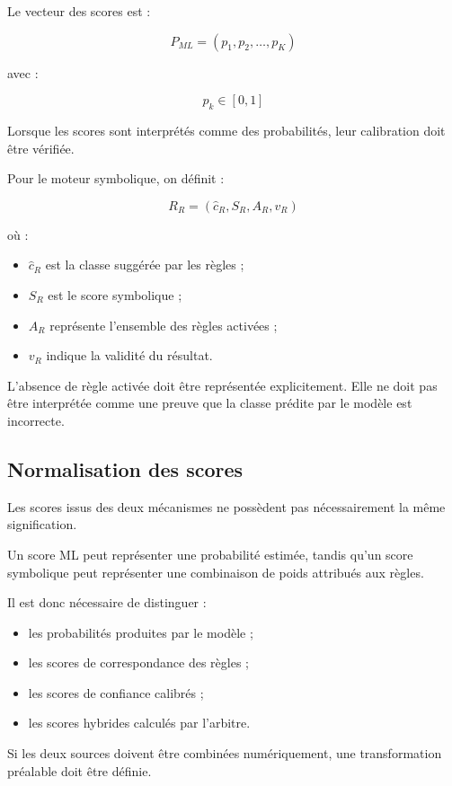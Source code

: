 Le vecteur des scores est :

\[
P_{ML}=
\left(
p_1,p_2,\ldots,p_K
\right)
\]

avec :

\[
p_k\in[0,1]
\]

Lorsque les scores sont interprétés comme des probabilités, leur calibration doit être vérifiée.

Pour le moteur symbolique, on définit :

\[
R_R=(\hat{c}_R,S_R,A_R,v_R)
\]

où :

\begin{itemize}
    \item $\hat{c}_R$ est la classe suggérée par les règles ;
    \item $S_R$ est le score symbolique ;
    \item $A_R$ représente l'ensemble des règles activées ;
    \item $v_R$ indique la validité du résultat.
\end{itemize}

L'absence de règle activée doit être représentée explicitement. Elle ne doit pas être interprétée comme une preuve que la classe prédite par le modèle est incorrecte.

\subsection{Normalisation des scores}

Les scores issus des deux mécanismes ne possèdent pas nécessairement la même signification.

Un score ML peut représenter une probabilité estimée, tandis qu'un score symbolique peut représenter une combinaison de poids attribués aux règles.

Il est donc nécessaire de distinguer :

\begin{itemize}
    \item les probabilités produites par le modèle ;
    \item les scores de correspondance des règles ;
    \item les scores de confiance calibrés ;
    \item les scores hybrides calculés par l'arbitre.
\end{itemize}

Si les deux sources doivent être combinées numériquement, une transformation préalable doit être définie.


